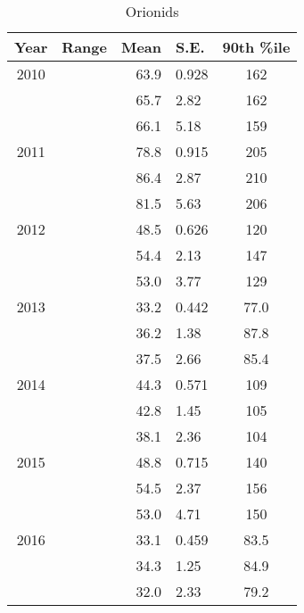 \begin{table}
	\centering
	\begin{tabular}{|c|c|r@{ \,$\pm$\, }l|c|}
		\hline 
		Year & Range & Mean & S.E. & 90th \%ile\\ 
		\hline 
		2010 & & 63.9 & 0.928 & 162   \\ 
		\hline 
		& &	65.7 & 2.82 & 162   \\ 
		\hline 
		& & 66.1 & 5.18 & 159   \\ 
		\hline 
		2011 & & 78.8 & 0.915 & 205   \\ 
		\hline 
		& & 86.4 & 2.87 & 210   \\ 
		\hline 
		& & 81.5 & 5.63 & 206   \\ 
		\hline 
		2012 & & 48.5 & 0.626 & 120   \\ 
		\hline 
		& & 54.4 & 2.13 & 147   \\ 
		\hline 
		& & 53.0 & 3.77 & 129   \\ 
		\hline 
		2013 & & 33.2 & 0.442 & 77.0   \\ 
		\hline 
		& & 36.2 & 1.38 & 87.8   \\ 
		\hline 
		& & 37.5 & 2.66 & 85.4   \\ 
		\hline 
		2014 & & 44.3 & 0.571 & 109   \\ 
		\hline 
		& & 42.8 & 1.45 & 105   \\ 
		\hline 
		& & 38.1 & 2.36 & 104  \\ 
		\hline 
		2015 & & 48.8 & 0.715 & 140   \\ 
		\hline 
		& & 54.5 & 2.37 & 156   \\ 
		\hline 
		& & 53.0 & 4.71 & 150   \\ 
		\hline
		2016 & & 33.1 & 0.459 & 83.5	\\
		\hline 
		& & 34.3 & 1.25 & 84.9   \\ 
		\hline 
		& & 32.0 & 2.33 & 79.2   \\ 
		\hline 
	\end{tabular}
	\caption{Orionids} 
\end{table}

